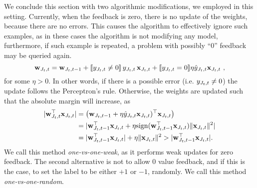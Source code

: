 We conclude this section with two algorithmic modifications, we employed in this setting. 
Currently, when the feedback is zero, there is no update of the weights, because there are no errors.
 This causes the algorithm to effectively ignore such examples, as in these cases the algorithm is not 
 modifying any model, furthermore, if such example is repeated, a problem with possibly ``0'' feedback 
 may be queried again.
\[
\mathbf{w}_{J_t,t} = \mathbf{w}_{J_t,t-1}+ [\![{y_{J_t,t}\ne0}]\!] \, y_{J_t,t}\, \mathbf{x}_{J_t,t} +
 [\![{y_{J_t,t}=0}]\!] \eta \hat{y}_{J_t,t}\mathbf{x}_{J_t,t}~,
\]
for some $\eta>0$. In other words, if there is a possible error (i.e. $y_{J_t,t}\ne0$) the update follows the 
Perceptron's rule. Otherwise, the weights are updated such that the absolute margin will increase, 
as 
\[
\begin{split}
\vert {\mathbf{w}}^{\top}_{J_t,t} \mathbf{x}_{J_t,t} \vert &= \left({\mathbf{w}_{J_t,t-1}+ \eta \hat{y}_{J_t,t}\mathbf{x}_{J_t,t})^\top\mathbf{x}_{J_t,t}}\right)\\ 
&= \vert {\mathbf{w}}^{\top}_{J_t,t-1}\mathbf{x}_{J_t,t}+ \eta {\rm sign}({\mathbf{w}}^{\top}_{J_t,t-1}\mathbf{x}_{J_t,t}) \Vert\mathbf{x}_{J_t,t}\Vert^2 \vert\\
&=\vert {\mathbf{w}}^{\top}_{J_t,t-1}\mathbf{x}_{J_t,t}\vert + \eta \Vert\mathbf{x}_{J_t,t}\Vert^2 >\vert {\mathbf{w}}^{\top}_{J_t,t-1}\mathbf{x}_{J_t,t}\vert. 
\end{split}
\]
We call this method {\em one-vs-one-weak}, as it performs weak updates for zero feedback. 
The second alternative is not to allow $0$ value feedback, and if this is the case, to set the label to be 
either $+1$ or $-1$, randomly.
We call this method {\em one-vs-one-random}.
